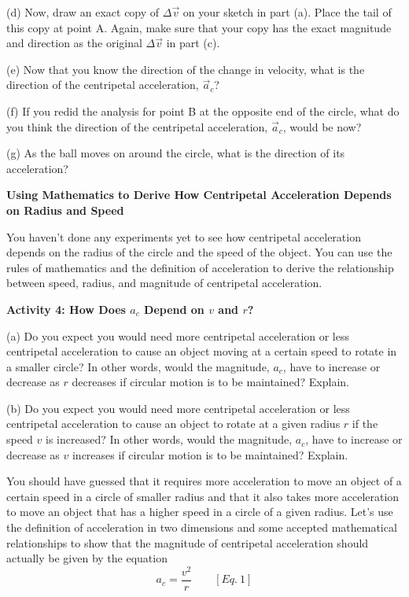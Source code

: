 (d) Now, draw an exact copy of \( \Delta  \)$\vec{v}$ on your sketch in part
(a). Place the tail of this copy at point A. Again, make sure that your copy
has the exact magnitude and direction as the original \( \Delta  \)$\vec{v}$
in part (c).
\vspace{20mm}

(e) Now that you know the direction of the change in velocity, what is the direction
of the centripetal acceleration, $\vec{a}_{c}$?
\vspace{20mm}

(f) If you redid the analysis for point B at the opposite end of the circle,
what do you think the direction of the centripetal acceleration, $\vec{a}_{c}$,
would be now?
\answerspace{20mm}

\pagebreak[2]
(g) As the ball moves on around the circle, what is the direction of its acceleration?
\answerspace{20mm}

\textbf{Using Mathematics to Derive How Centripetal Acceleration Depends on
Radius and Speed }

You haven't done any experiments yet to see how centripetal acceleration depends
on the radius of the circle and the speed of the object. You can use the rules
of mathematics and the definition of acceleration to derive the relationship
between speed, radius, and magnitude of centripetal acceleration. 

\textbf{Activity 4: How Does ${a_{c}}$ Depend on $v$ and $r$?} 

(a) Do you expect you would need more centripetal acceleration or less centripetal
acceleration to cause an object moving at a certain speed to rotate in a smaller
circle? In other words, would the magnitude, \( a_{c} \), have to increase
or decrease as $r$ decreases if circular motion is to be maintained? Explain.
\answerspace{20mm}

(b) Do you expect you would need more centripetal acceleration or less centripetal
acceleration to cause an object to rotate at a given radius $r$ if the speed 
$v$
is increased? In other words, would the magnitude, \( a_{c} \), have to increase
or decrease as $v$ increases if circular motion is to be maintained? Explain.
\answerspace{20mm}

You should have guessed that it requires more acceleration to move an object
of a certain speed in a circle of smaller radius and that it also takes more
acceleration to move an object that has a higher speed in a circle of a given
radius. Let's use the definition of acceleration in two dimensions and some accepted
mathematical relationships to show that the magnitude of centripetal acceleration
should actually be given by the equation
\[
a_{c}=\frac{v^{2}}{r}\qquad [Eq.\: 1]\]


